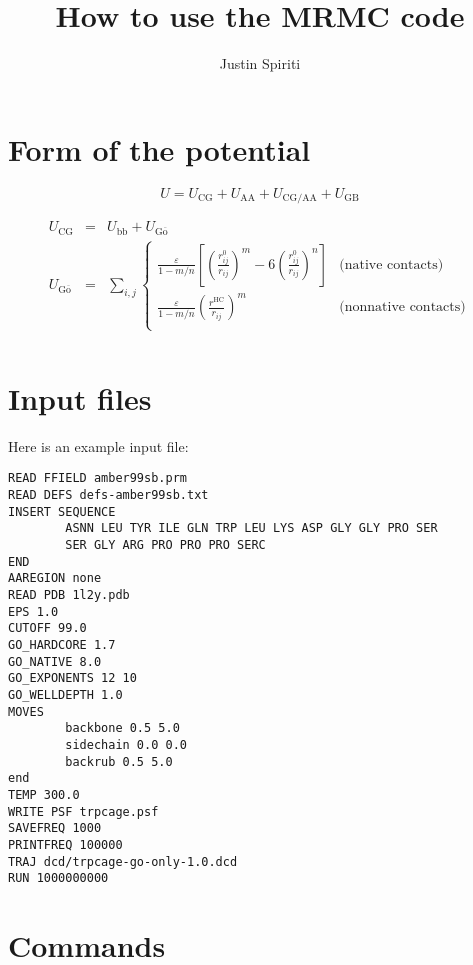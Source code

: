 \documentclass{article}      %
\title{How to use the MRMC code}  %
\author{Justin Spiriti}      %
\begin{document}

\maketitle                   %

\section{Form of the potential}

\begin{equation}
U = U_\mathrm{CG} + U_\mathrm{AA} + U_\mathrm{CG/AA} + U_\mathrm{GB}
\end{equation}

\begin{eqnarray}
U_\mathrm{CG} &=& U_\mathrm{bb} + U_\mathrm{G\overline{o}} \\
U_\mathrm{G\overline{o}} &=& \sum_{i,j} \left\{ 
\begin{array}{ll}
\frac{\varepsilon}{1-m/n} \left[\left(\frac{r^0_{ij}}{r_{ij}}\right)^{m}-6\left(\frac{r^0_{ij}}{r_{ij}}\right)^{n}\right] & \textrm{(native contacts)} \\
\frac{\varepsilon}{1-m/n} \left(\frac{r^\mathrm{HC}}{r_{ij}}\right)^{m}& \textrm{(nonnative contacts)} \\
\end{array}
\right. \\ 
\end{eqnarray}

\section{Input files}
Here is an example input file:
\begin{verbatim}
READ FFIELD amber99sb.prm
READ DEFS defs-amber99sb.txt
INSERT SEQUENCE
        ASNN LEU TYR ILE GLN TRP LEU LYS ASP GLY GLY PRO SER
        SER GLY ARG PRO PRO PRO SERC
END
AAREGION none
READ PDB 1l2y.pdb
EPS 1.0
CUTOFF 99.0
GO_HARDCORE 1.7
GO_NATIVE 8.0
GO_EXPONENTS 12 10
GO_WELLDEPTH 1.0
MOVES
        backbone 0.5 5.0
        sidechain 0.0 0.0
        backrub 0.5 5.0
end
TEMP 300.0
WRITE PSF trpcage.psf
SAVEFREQ 1000
PRINTFREQ 100000
TRAJ dcd/trpcage-go-only-1.0.dcd
RUN 1000000000
\end{verbatim}

\section{Commands}
\end{document}
